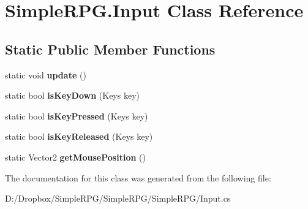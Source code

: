 \hypertarget{class_simple_r_p_g_1_1_input}{\section{Simple\+R\+P\+G.\+Input Class Reference}
\label{class_simple_r_p_g_1_1_input}
}
\subsection*{Static Public Member Functions}
\begin{DoxyCompactItemize}
\item 
\hypertarget{class_simple_r_p_g_1_1_input_a5030a4e61c1ca8fc490575e968339126}{static void {\bfseries update} ()}\label{class_simple_r_p_g_1_1_input_a5030a4e61c1ca8fc490575e968339126}

\item 
\hypertarget{class_simple_r_p_g_1_1_input_a187b5eab7cd9b9f198adb08d7a507b3c}{static bool {\bfseries is\+Key\+Down} (Keys key)}\label{class_simple_r_p_g_1_1_input_a187b5eab7cd9b9f198adb08d7a507b3c}

\item 
\hypertarget{class_simple_r_p_g_1_1_input_ab67cea9332b183fb664d9bf497ad61c6}{static bool {\bfseries is\+Key\+Pressed} (Keys key)}\label{class_simple_r_p_g_1_1_input_ab67cea9332b183fb664d9bf497ad61c6}

\item 
\hypertarget{class_simple_r_p_g_1_1_input_aa2424d5308db570017de73a616ad48eb}{static bool {\bfseries is\+Key\+Released} (Keys key)}\label{class_simple_r_p_g_1_1_input_aa2424d5308db570017de73a616ad48eb}

\item 
\hypertarget{class_simple_r_p_g_1_1_input_a70cff65ec2b3d91956952a1986fa22d6}{static Vector2 {\bfseries get\+Mouse\+Position} ()}\label{class_simple_r_p_g_1_1_input_a70cff65ec2b3d91956952a1986fa22d6}

\end{DoxyCompactItemize}


The documentation for this class was generated from the following file\+:\begin{DoxyCompactItemize}
\item 
D\+:/\+Dropbox/\+Simple\+R\+P\+G/\+Simple\+R\+P\+G/\+Simple\+R\+P\+G/Input.\+cs\end{DoxyCompactItemize}
